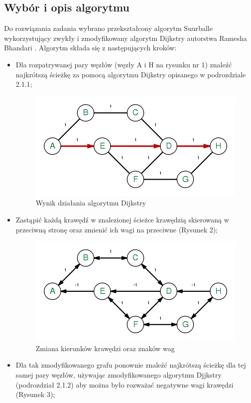 \documentclass[a4paper,12pt]{article}
\newcommand\tab[1][1cm]{\hspace*{#1}}
\begin{document}
\subsection{Wybór i opis algorytmu}
\tab
Do rozwiązania zadania wybrano przekształcony algorytm Suurballe \cite{surb} wykorzystujący zwykły i zmodyfikowany algorytm Dijkstry autorstwa Ramesha Bhandari \cite{bhan}. Algorytm składa się z następujących kroków:
\begin{itemize}
\item Dla rozpatrywanej pary węzłów (węzły A i H na rysunku nr 1) znaleźć najkrótszą ścieżkę za pomocą algorytmu Dijkstry opisanego w podrozdziale 2.1.1;
\begin{figure}[H]
\caption{Wynik działania algorytmu Dijkstry}
\includegraphics[]{bahdari_2.png}
\end{figure}
\item Zastąpić każdą krawędź w znalezionej ścieżce krawędzią skierowaną w przeciwną stronę oraz zmienić ich wagi na przeciwne (Rysunek 2);
\begin{figure}[H]
\caption{Zmiana kierunków krawędzi oraz znaków wag}
\includegraphics[]{bahdari_3.png}
\end{figure}
\item Dla tak zmodyfikowanego grafu ponownie znaleźć najkrótszą ścieżkę dla tej samej pary węzłów, używając zmodyfikowanego algorytmu Djjkstry (podrozdział 2.1.2) aby można było rozważać negatywne wagi krawędzi (Rysunek 3);
\begin{figure}[H]

\end{figure}
\end{itemize}
\end{document}
